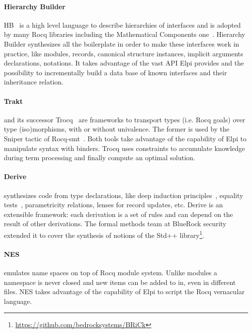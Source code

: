 \documentclass[sigplan,natbib=false]{acmart}
\begin{document}
\paragraph{Hierarchy Builder} HB~\cite{cohen_et_al:LIPIcs.FSCD.2020.34} is a high level language to describe hierarchies
of interfaces and is adopted by many Rocq libraries including the Mathematical
Components one~\cite{affeldt:hal-03463762}. Hierarchy Builder synthesizes all the boilerplate in order to
make these interfaces work in practice, like modules, records, canonical
structure instances, implicit arguments declarations, notations. It takes
advantage of the vast API Elpi provides and the possibility to incrementally
build a data base of known interfaces and their inheritance relation.

\paragraph{Trakt} and its successor Trocq~\cite{10.1007/978-3-031-57262-3_10} are
frameworks to transport
types (i.e. Rocq goals) over type (iso)morphisms, with or without univalence.
The former is used by the Sniper tactic of Rocq-smt~\cite{DBLP:conf/cpp/Blot0CPKMV23}.
Both tools take advantage of the capability of Elpi to manipulate syntax
with binders. Trocq uses constraints to accumulate knowledge during
term processing and finally compute an optimal solution.

\paragraph{Derive} synthesizes code from type declarations, like deep
induction principles~\cite{tassi:hal-01897468},
equality tests~\cite{gregoire:hal-03800154}, parametricity relations,
lenses for record updates, etc.
Derive is an extensible framework: each derivation is a set of rules and can
depend on the result of other derivations. The formal methods team at BlueRock
security extended it to cover the synthesis of notions of the Std++
library\footnote{\url{https://github.com/bedrocksystems/BRiCk}}.

\paragraph{NES} emulates name spaces on top of Rocq module system. Unlike
modules a namespace is never closed and new items can be added to in, even
in different files. NES takes advantage of the capability of Elpi to script
the Rocq vernacular language.
\end{document}
